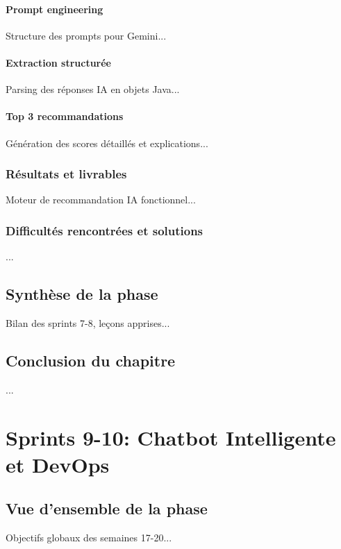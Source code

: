 \documentclass[12pt,a4paper]{report}
\begin{document}
\subsubsection{Prompt engineering}
Structure des prompts pour Gemini...

\subsubsection{Extraction structurée}
Parsing des réponses IA en objets Java...

\subsubsection{Top 3 recommandations}
Génération des scores détaillés et explications...

\subsection{Résultats et livrables}
Moteur de recommandation IA fonctionnel...

\subsection{Difficultés rencontrées et solutions}
...

\section{Synthèse de la phase}
Bilan des sprints 7-8, leçons apprises...

\section{Conclusion du chapitre}
...

\chapter{Sprints 9-10: Chatbot Intelligente et DevOps}
\label{chap:sprints9-10}

\section{Vue d'ensemble de la phase}
Objectifs globaux des semaines 17-20...
\end{document}
